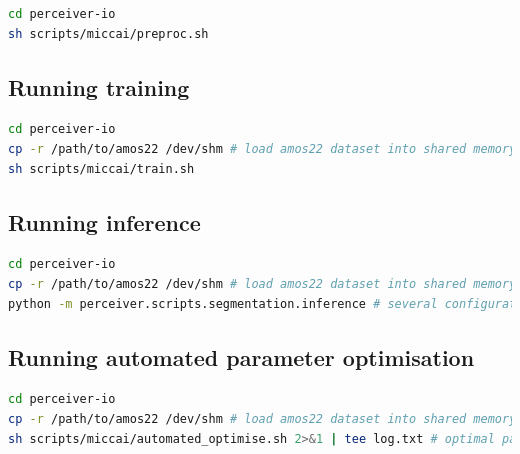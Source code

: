 \documentclass{l4proj}
\begin{document}
\begin{appendices}
\begin{lstlisting}[language=bash]
cd perceiver-io
sh scripts/miccai/preproc.sh
\end{lstlisting}

\subsection{Running training}

\begin{lstlisting}[language=bash]
cd perceiver-io
cp -r /path/to/amos22 /dev/shm # load amos22 dataset into shared memory. not all data must be loaded to memory, only, imagesTr_preprocessed/* labelsTr_preprocessed/*, dataset.json, and several empty folders: [imagesTr, imagesVa, imagesVa_preprocessed, labelsTr, labelsVa, labelsVa_preprocessed]
sh scripts/miccai/train.sh
\end{lstlisting}

\subsection{Running inference}

\begin{lstlisting}[language=bash]
cd perceiver-io
cp -r /path/to/amos22 /dev/shm # load amos22 dataset into shared memory. not all data must be loaded to memory, only, imagesTr_preprocessed/* labelsTr_preprocessed/*, dataset.json, and several empty folders: [imagesTr, imagesVa, imagesVa_preprocessed, labelsTr, labelsVa, labelsVa_preprocessed] This obviously depends on what dataset split is to be inferenced
python -m perceiver.scripts.segmentation.inference # several configuration parameters can be changed in the GLOBALS at the start of the corresponding file
\end{lstlisting}

\subsection{Running automated parameter optimisation}

\begin{lstlisting}[language=bash]
cd perceiver-io
cp -r /path/to/amos22 /dev/shm # load amos22 dataset into shared memory. not all data must be loaded to memory, only, imagesTr_preprocessed/* labelsTr_preprocessed/*, dataset.json, and several empty folders: [imagesTr, imagesVa, imagesVa_preprocessed, labelsTr, labelsVa, labelsVa_preprocessed]
sh scripts/miccai/automated_optimise.sh 2>&1 | tee log.txt # optimal parameters will be printed to the console, hence recommending using the use of tee
\end{lstlisting}


\end{appendices}
\end{document}
